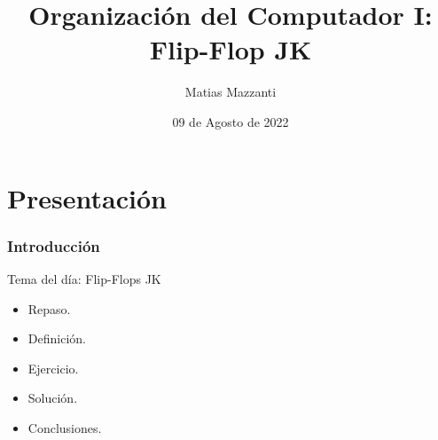 \documentclass[10pt]{beamer}
\title[Flip-Flop JK]{Organizaci\'on del Computador I: Flip-Flop JK}
\author[Matias Mazzanti]{Matias Mazzanti}
\institute{DC-UBA}
\date{09 de Agosto de 2022}
\begin{document}
\begin{frame}

\maketitle

\end{frame}


\section{Presentaci\'on}
\begin{frame}
\frametitle{Introducción}
\begin{mdframed}[backgroundcolor=frenchblue!20]
  \centering
  Tema del día: Flip-Flops JK
\end{mdframed}
\pause

\begin{itemize}
  \item Repaso.
  \item Definición.
  \item Ejercicio.
  \item Solución.
  \item Conclusiones.
\end{itemize}

\end{frame}
\end{document}
